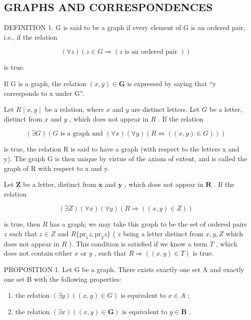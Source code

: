 \subsection{GRAPHS AND CORRESPONDENCES}

DEFINITION 1. G is said to be a graph if every element of G is an ordered pair, i.e., if the relation

\[
(\forall z) (z \in G \Longrightarrow (z \text {   is   an   ordered   pair }))
\]

is true.

If G is a graph, the relation \((x, y) \in \mathbf{G}\) is expressed by saying that ``y corresponds to x under G''.

Let \(R \mid x, y \mid\) be a relation, where \(x\) and \(y\) are distinct letters. Let \(G\) be a letter, distinct from \(x\) and \(y\) , which does not appear in \(R\) . If the relation

\[
(\exists G) (G \text {   is   a   graph   and   } (\forall x) (\forall y) (R \Longleftrightarrow ((x, y) \in G)))
\]

is true, the relation R is said to have a graph (with respect to the letters x and y). The graph G is then unique by virtue of the axiom of extent, and is called the graph of R with respect to x and y.

Let \(\pmb{Z}\) be a letter, distinct from \(\pmb{x}\) and \(\pmb{y}\) , which does not appear in \(\pmb{R}\) . If the relation

\[
(\exists Z) (\forall x) (\forall y) (R \Longrightarrow ((x, y) \in Z))
\]

is true, then \(R\) has a graph; we may take this graph to be the set of ordered pairs \(z\) such that \(z \in Z\) and \(R \{ \text{pr}_1 z, \text{pr}_2 z \}\) ( \(z\) being a letter distinct from \(x, y, Z\) which does not appear in \(R\) ). This condition is satisfied if we know a term \(T\) , which does not contain either \(x\) or \(y\) , such that \(R \Longrightarrow ((x, y) \in T)\) is true.

PROPOSITION 1. Let G be a graph. There exists exactly one set A and exactly one set B with the following properties:

\begin{enumerate}
\def\labelenumi{(\arabic{enumi})}
\item
  the relation \((\exists y)((x, y) \in G)\) is equivalent to \(x \in A\) ;
\item
  the relation \((\exists x)((x, y) \in \mathbf{G})\) is equivalent to \(y \in \mathbf{B}\) .
\end{enumerate}

